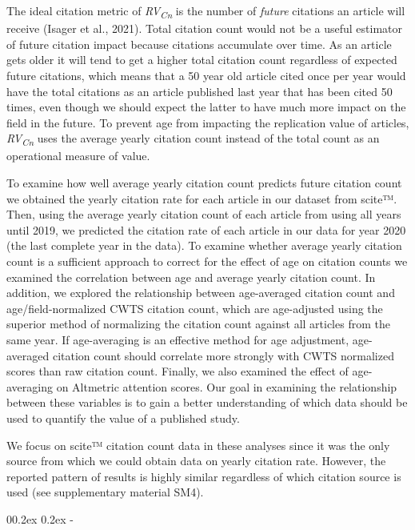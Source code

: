 \documentclass[
  man,floatsintext]{apa6}
\makeatletter
\let\oldsubparagraph\subparagraph
\renewcommand{\subparagraph}[1]{\oldsubparagraph{#1}\mbox{}}
\renewcommand{\subparagraph}[1]{\@startsection{subparagraph}{5}{1em}%
  {0\baselineskip \@plus 0.2ex \@minus 0.2ex}%
  {-\z@\relax}%
  {\normalfont\normalsize\itshape\hspace{\parindent}{#1}\textit{\addperi}}{\relax}}
\makeatother
\begin{document}
The ideal citation metric of \emph{RV\textsubscript{Cn}} is the number of \emph{future} citations an article will receive (Isager et al., 2021). Total citation count would not be a useful estimator of future citation impact because citations accumulate over time. As an article gets older it will tend to get a higher total citation count regardless of expected future citations, which means that a 50 year old article cited once per year would have the total citations as an article published last year that has been cited 50 times, even though we should expect the latter to have much more impact on the field in the future. To prevent age from impacting the replication value of articles, \emph{RV\textsubscript{Cn}} uses the average yearly citation count instead of the total count as an operational measure of value.

To examine how well average yearly citation count predicts future citation count we obtained the yearly citation rate for each article in our dataset from scite™. Then, using the average yearly citation count of each article from using all years until 2019, we predicted the citation rate of each article in our data for year 2020 (the last complete year in the data). To examine whether average yearly citation count is a sufficient approach to correct for the effect of age on citation counts we examined the correlation between age and average yearly citation count. In addition, we explored the relationship between age-averaged citation count and age/field-normalized CWTS citation count, which are age-adjusted using the superior method of normalizing the citation count against all articles from the same year. If age-averaging is an effective method for age adjustment, age-averaged citation count should correlate more strongly with CWTS normalized scores than raw citation count. Finally, we also examined the effect of age-averaging on Altmetric attention scores. Our goal in examining the relationship between these variables is to gain a better understanding of which data should be used to quantify the value of a published study.

We focus on scite™ citation count data in these analyses since it was the only source from which we could obtain data on yearly citation rate. However, the reported pattern of results is highly similar regardless of which citation source is used (see supplementary material SM4).

\hypertarget{predictive-accuracy}{%
\subparagraph{Predictive accuracy}\label{predictive-accuracy}}
\end{document}

